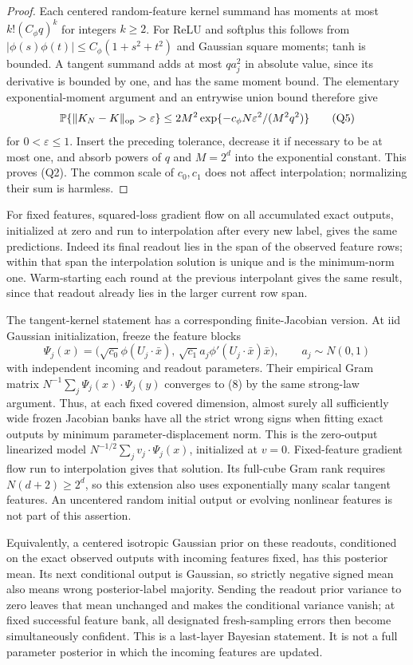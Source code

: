 \documentclass[11pt]{article}
\newcommand{\Pp}{\mathbb P}
\begin{document}
\begin{proof}
Each centered random-feature kernel summand has moments at most
$k!(C_\phi q)^k$ for integers $k\ge2$. For ReLU and softplus this
follows from $|\phi(s)\phi(t)|\le C_\phi(1+s^2+t^2)$ and Gaussian
square moments; tanh is bounded. A tangent summand adds at most
$q a_j^2$ in absolute value, since its derivative is bounded by one,
and has the same moment bound. The elementary exponential-moment
argument and an entrywise union bound therefore give
\[
 \Pp\{\|K_N-K\|_{\rm op}>\varepsilon\}
 \le2M^2\exp\{-c_\phi N\varepsilon^2/(M^2q^2)\}
                                                               \tag{Q5}
\]
for $0<\varepsilon\le1$. Insert the preceding tolerance, decrease it
if necessary to be at most one, and absorb powers of $q$ and $M=2^d$
into the exponential constant. This proves (Q2). The common scale of
$c_0,c_1$ does not affect interpolation; normalizing their sum is harmless.
\end{proof}

For fixed features, squared-loss gradient flow on all accumulated exact
outputs, initialized at zero and run to interpolation after every new
label, gives the same predictions. Indeed its final readout lies in
the span of the observed feature rows; within that span the interpolation
solution is unique and is the minimum-norm one. Warm-starting each round
at the previous interpolant gives the same result, since that readout
already lies in the larger current row span.

The tangent-kernel statement has a corresponding finite-Jacobian
version. At iid Gaussian initialization, freeze the feature blocks
\[
 \Psi_j(x)=\big(\sqrt{c_0}\phi(U_j\cdot\bar x),\,
       \sqrt{c_1}a_j\phi'(U_j\cdot\bar x)\bar x\big),
       \qquad a_j\sim N(0,1)
\]
with independent incoming and readout parameters. Their empirical
Gram matrix $N^{-1}\sum_j\Psi_j(x)\cdot\Psi_j(y)$ converges to
(8) by the same strong-law argument. Thus, at each fixed covered
dimension, almost surely all sufficiently wide frozen Jacobian banks
have all the strict wrong signs when fitting exact outputs by minimum
parameter-displacement norm. This is the zero-output linearized model
$N^{-1/2}\sum_j v_j\cdot\Psi_j(x)$, initialized at $v=0$.
Fixed-feature gradient flow run to interpolation gives that solution.
Its full-cube Gram rank requires $N(d+2)\ge2^d$, so this extension
also uses exponentially many scalar tangent features. An uncentered
random initial output or evolving nonlinear features is not part of this
assertion.

Equivalently, a centered isotropic Gaussian prior on these readouts,
conditioned on the exact observed outputs with incoming features fixed,
has this posterior mean. Its next conditional output is Gaussian, so
strictly negative signed mean also means wrong posterior-label majority.
Sending the readout prior variance to zero leaves that mean unchanged
and makes the conditional variance vanish; at fixed successful feature
bank, all designated fresh-sampling errors then become simultaneously
confident. This is a last-layer Bayesian statement. It is not a full
parameter posterior in which the incoming features are updated.
\end{document}
